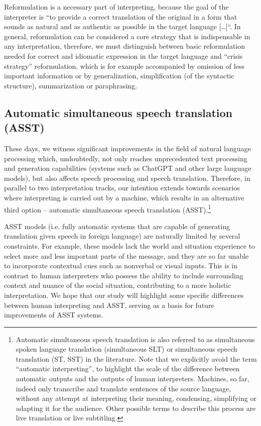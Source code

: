 \documentclass[output=paper]{langscibook}
\begin{document}

Reformulation is a necessary part of interpreting, because the goal of the interpreter is “to provide a correct translation of the original in a form that sounds as natural and as authentic as possible in the target language […]“. \citep[82]{Jones2002} In general, reformulation can be considered a core strategy that is indispensable in any interpretation, therefore, we must distinguish between basic reformulation needed for correct and idiomatic expression in the target language and “crisis strategy” reformulation, which is for example accompanied by omission of less important information or by generalization, simplification (of the syntactic structure), summarization or paraphrasing.

\subsection{Automatic simultaneous speech translation (ASST)} %

These days, we witness significant improvements in the field of natural language processing which, undoubtedly, not only reaches unprecedented text processing and generation capabilities (systems such as ChatGPT and other large language models), but also affects speech processing and speech translation. Therefore, in parallel to two interpretation tracks, our intention extends towards scenarios where interpreting is carried out by a machine, which results in an alternative third option – automatic simultaneous speech translation (ASST).\footnote{{Automatic simultaneous speech translation is also referred to as simultaneous spoken language translation (simultaneous SLT) or simultaneous speech translation (ST, SST) in the literature. Note that we explicitly avoid the term “automatic interpreting”, to highlight the scale of the difference between automatic outputs and the outputs of human interpreters. Machines, so far, indeed only transcribe and translate sentences of the source language, without any attempt at interpreting their meaning, condensing, simplifying or adapting it for the audience. Other possible terms to describe this process are live translation or live subtitling.}}

ASST models (i.e. fully automatic systems that are capable of generating translation given speech in foreign language) are naturally limited by several constraints. For example, these models lack the world and situation experience to select more and less important parts of the message, and they are so far unable to incorporate contextual cues such as nonverbal or visual inputs. This is in contrast to human interpreters who possess the ability to include surrounding context and nuance of the social situation, contributing to a more holistic interpretation. We hope that our study will highlight some specific differences between human interpreting and ASST, serving as a basis for future improvements of ASST systems.
\end{document}
